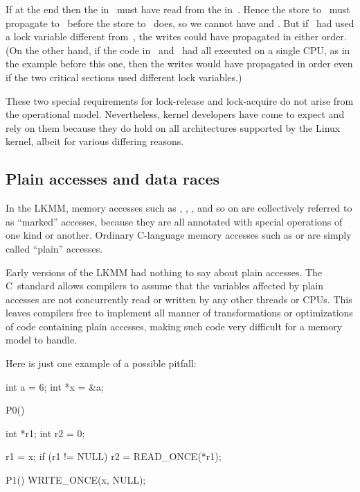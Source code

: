If  at the end then the  in~ must
have read from
the  in~.
Hence the store to~ must propagate to~
before the store to~ does, so we cannot have  and
.
But
if ~had used a lock variable different from~, the writes could have
propagated in either order.
(On the other hand, if the code in~ and~
had all executed on a single CPU, as in the example before this
one, then the writes would have propagated in order even if the two
critical sections used different lock variables.)

These two special requirements for lock-release and lock-acquire do
not arise from the operational model.
Nevertheless, kernel developers
have come to expect and rely on them because they do hold on all
architectures supported by the Linux kernel, albeit for various
differing reasons.


\subsection{Plain accesses and data races}
\label{sec:docs:explanation:Plain Accesses and Data Races}

In the LKMM, memory accesses such as , ,
, and so on are collectively referred to as
``marked'' accesses, because they are all annotated with special
operations of one kind or another.
Ordinary C-language memory
accesses such as  or  are simply called ``plain'' accesses.

Early versions of the LKMM had nothing to say about plain accesses.
The C~standard allows compilers to assume that the variables affected
by plain accesses are not concurrently read or written by any other
threads or CPUs.
This leaves compilers free to implement all manner
of transformations or optimizations of code containing plain accesses,
making such code very difficult for a memory model to handle.

Here is just one example of a possible pitfall:

\begin{VerbatimU}
	int a = 6;
	int *x = &a;

	P0()
	{
		int *r1;
		int r2 = 0;

		r1 = x;
		if (r1 != NULL)
			r2 = READ_ONCE(*r1);
	}

	P1()
	{
		WRITE_ONCE(x, NULL);
	}
\end{VerbatimU}

